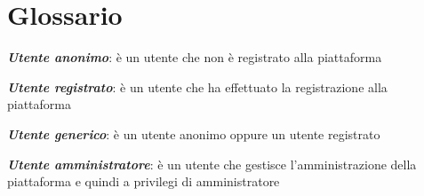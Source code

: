 \documentclass{article}
\begin{document}
\newpage

\section*{Glossario}

\textit{\textbf{Utente anonimo}}: è un utente che non è registrato alla piattaforma

\textit{\textbf{Utente registrato}}: è un utente che ha effettuato la registrazione alla piattaforma

\textit{\textbf{Utente generico}}: è un utente anonimo oppure un utente registrato

\textit{\textbf{Utente amministratore}}: è un utente che gestisce l'amministrazione della piattaforma e quindi a privilegi di amministratore
\end{document}

